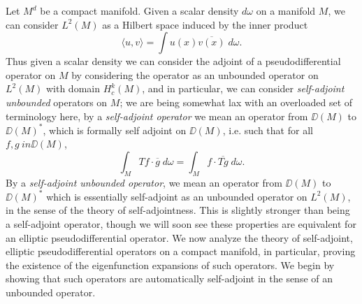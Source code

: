 Let $M^d$ be a compact manifold. Given a scalar density $d\omega$ on a manifold $M$, we can consider $L^2(M)$ as a Hilbert space induced by the inner product
%
\[ \langle u, v \rangle = \int u(x) \overline{v(x)}\; d\omega. \]
%
Thus given a scalar density we can consider the adjoint of a pseudodifferential operator on $M$ by considering the operator as an unbounded operator on $L^2(M)$ with domain $H^k_c(M)$, and in particular, we can consider \emph{self-adjoint unbounded} operators on $M$; we are being somewhat lax with an overloaded set of terminology here, by a \emph{self-adjoint operator} we mean an operator from $\DD(M)$ to $\DD(M)^*$, which is formally self adjoint on $\DD(M)$, i.e. such that for all $f,g\ in \DD(M)$,
%
\[ \int_M Tf \cdot \overline{g}\; d\omega = \int_M f \cdot \overline{Tg}\; d\omega. \]
%
By a \emph{self-adjoint unbounded operator}, we mean an operator from $\DD(M)$ to $\DD(M)^*$ which is essentially self-adjoint as an unbounded operator on $L^2(M)$, in the sense of the theory of self-adjointness. This is slightly stronger than being a self-adjoint operator, though we will soon see these properties are equivalent for an elliptic pseudodifferential operator. We now analyze the theory of self-adjoint, elliptic pseudodifferential operators on a compact manifold, in particular, proving the existence of the eigenfunction expansions of such operators. We begin by showing that such operators are automatically self-adjoint in the sense of an unbounded operator.

